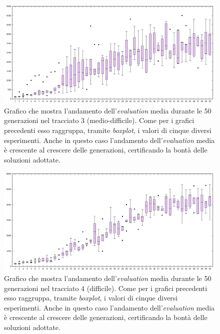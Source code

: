 \documentclass[a4paper,12pt]{article}
\begin{document}
\begin{figure}[H]
	\centering
	\includegraphics[width=130mm]{../results/track03/averageEvaluation.png}
	\caption{Grafico che mostra l'andamento dell'\emph{evaluation} media durante le 50 generazioni nel tracciato 3 (medio-difficile). Come per i grafici precedenti esso raggruppa, tramite \emph{boxplot}, i valori di cinque diversi esperimenti. Anche in questo caso l'andamento dell'\emph{evaluation} media è crescente al crescere delle generazioni, certificando la bontà delle soluzioni adottate. }
\end{figure}

\begin{figure}
	\centering
	\includegraphics[width=130mm]{../results/track04/averageEvaluation.png}
	\caption{Grafico che mostra l'andamento dell'\emph{evaluation} media durante le 50 generazioni nel tracciato 4 (difficile). Come per i grafici precedenti esso raggruppa, tramite \emph{boxplot}, i valori di cinque diversi esperimenti. Anche in questo caso l'andamento dell'\emph{evaluation} media è crescente al crescere delle generazioni, certificando la bontà delle soluzioni adottate. }
\end{figure}
\end{document}
